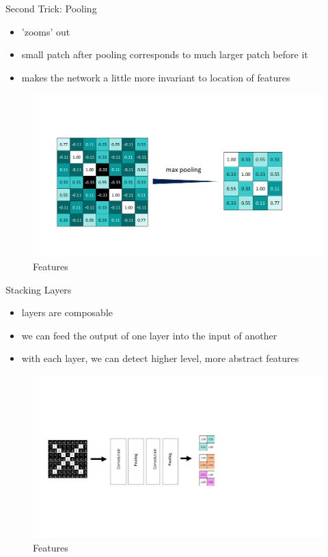 \documentclass[12pt]{beamer}
\begin{document}
\begin{frame}{Second Trick: Pooling}
  \begin{itemize}
  \item 'zooms' out
  \item small patch after pooling corresponds to much larger patch before it
   \item makes the network a little more invariant to location of features
    \end{itemize}
\begin{figure}
\includegraphics[width = 0.8\linewidth]{images/pooling.jpg}
\caption{Features}
\label{fig:principle}
\end{figure}

\end{frame}

\begin{frame}{Stacking Layers}
  \begin{itemize}
  \item layers are composable
   \item we can feed the output of one layer into the input of another
   \item with each layer, we can detect higher level, more abstract features
    \end{itemize}
\begin{figure}
\includegraphics[width = 0.9\linewidth]{images/stacking.jpg}
\caption{Features}
\label{fig:principle}
\end{figure}

\end{frame}
\end{document}

